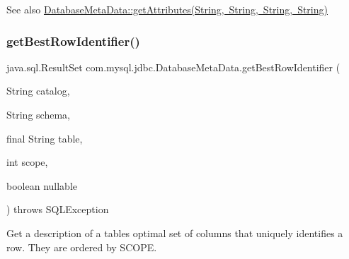 \begin{DoxySeeAlso}{See also}
\mbox{\hyperlink{classcom_1_1mysql_1_1jdbc_1_1_database_meta_data_a838b298c0d9bc6061ba699e76100f66d}{Database\+Meta\+Data\+::get\+Attributes(\+String, String, String, String)}} 
\end{DoxySeeAlso}
\mbox{\label{classcom_1_1mysql_1_1jdbc_1_1_database_meta_data_aa8a8a2f7924aa411eebaae653e1f3802}} 
\subsubsection{\texorpdfstring{get\+Best\+Row\+Identifier()}{getBestRowIdentifier()}}
{\footnotesize\ttfamily java.\+sql.\+Result\+Set com.\+mysql.\+jdbc.\+Database\+Meta\+Data.\+get\+Best\+Row\+Identifier (\begin{DoxyParamCaption}\item[{String}]{catalog,  }\item[{String}]{schema,  }\item[{final String}]{table,  }\item[{int}]{scope,  }\item[{boolean}]{nullable }\end{DoxyParamCaption}) throws S\+Q\+L\+Exception}

Get a description of a table\textquotesingle{}s optimal set of columns that uniquely identifies a row. They are ordered by S\+C\+O\+PE. 

